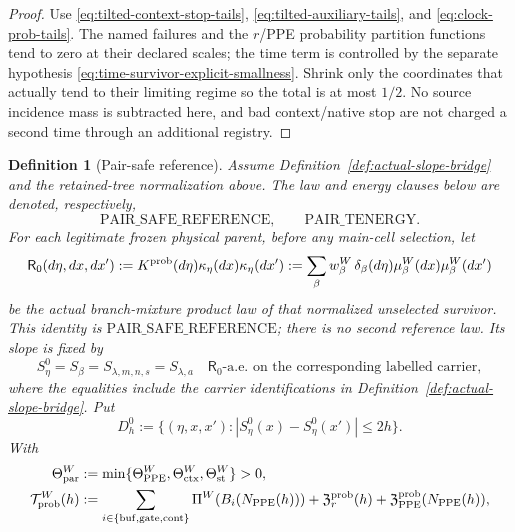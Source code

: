 \documentclass[11pt]{article}
\newtheorem{definition}[theorem]{Definition}
\begin{document}
\begin{proof}
Use \eqref{eq:tilted-context-stop-tails},
\eqref{eq:tilted-auxiliary-tails}, and
\eqref{eq:clock-prob-tails}.  The named failures and the $r$/PPE probability
partition functions tend to zero at their declared scales; the time term is
controlled by the separate hypothesis
\eqref{eq:time-survivor-explicit-smallness}.  Shrink only the coordinates
that actually tend to their limiting regime so the total is at most $1/2$.
No source
incidence mass is subtracted here, and bad context/native stop are not
charged a second time through an additional registry.
\end{proof}

\begin{definition}[Pair-safe reference]
\label{def:pair-safe-reference}
Assume Definition~\ref{def:actual-slope-bridge} and the retained-tree
normalization above.  The law and energy clauses below are denoted,
respectively,
\[
 \mathrm{PAIR\_SAFE\_REFERENCE},\qquad
 \mathrm{PAIR\_TENERGY}.
\]
For each
legitimate frozen physical parent, before
any main-cell selection, let
\begin{equation}
\label{eq:unselected-reference-law}
 \mathsf R_0(d\eta,dx,dx')
 :=K^{\rm prob}(d\eta)\kappa_\eta(dx)\kappa_\eta(dx')
 :=\sum_\beta w_\beta^W\,
   \delta_\beta(d\eta)\mu_\beta^W(dx)\mu_\beta^W(dx')
\end{equation}
be the actual branch-mixture product law of that normalized unselected
survivor.  This identity is $\mathrm{PAIR\_SAFE\_REFERENCE}$; there is no
second reference law.  Its slope is fixed by
\begin{equation}
\label{eq:reference-slope-identification}
 S_\eta^0=S_\beta=S_{\lambda,m,n,s}=S_{\lambda,a}
 \quad \mathsf R_0\text{-a.e. on the corresponding labelled carrier},
\end{equation}
where the equalities include the carrier identifications in
Definition~\ref{def:actual-slope-bridge}.  Put
\begin{equation}
\label{eq:exact-reference-pair-event}
 D_h^0:=\{(\eta,x,x'):
     |S_\eta^0(x)-S_\eta^0(x')|\le2h\}.
\end{equation}
With
\begin{align}
 \Theta_{\rm par}^{W}&:=\min\{\Theta_{\rm PPE}^{W},
        \Theta_{\rm ctx}^{W},\Theta_{\rm st}^{W}\}>0,
 \label{eq:physical-energy-exponent}\\
 \mathcal T_{\rm prob}^{W}(h)&:=
 \sum_{i\in\{\rm buf,gate,cont\}}\Pi^W(B_i(N_{\rm PPE}(h)))
 +\mathfrak Z_r^{\rm prob}(h)
 +\mathfrak Z_{\rm PPE}^{\rm prob}(N_{\rm PPE}(h)),

\end{align}
\end{definition}
\end{document}
